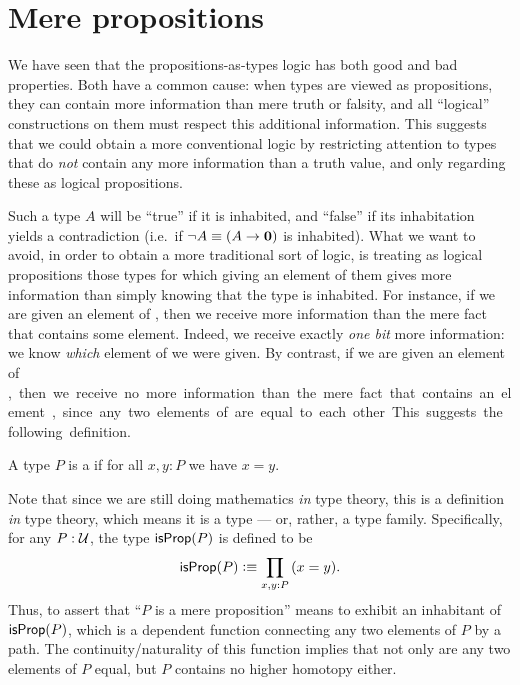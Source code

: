 \section{Mere propositions}
\label{subsec:hprops}

We have seen that the propositions-as-types logic has both good and bad properties.
Both have a common cause: when types are viewed as propositions, they can contain more information than mere truth or falsity, and all ``logical'' constructions on them must respect this additional information.
This suggests that we could obtain a more conventional logic by restricting attention to types that do \emph{not} contain any more information than a truth value, and only regarding these as logical propositions.

Such a type $A$ will be ``true'' if it is inhabited, and ``false'' if its inhabitation yields a contradiction (i.e.\ if $\neg A \equiv (A\to\mathbf{0})$ is inhabited).
What we want to avoid, in order to obtain a more traditional sort of logic, is treating as logical propositions those types for which giving an element of them gives more information than simply knowing that the type is inhabited.
For instance, if we are given an element of \bool, then we receive more information than the mere fact that \bool contains some element.
Indeed, we receive exactly \emph{one bit} more information: we know \emph{which} element of \bool we were given.
By contrast, if we are given an element of \unit, then we receive no more information than the mere fact that \unit contains an element, since any two elements of \unit are equal to each other.
This suggests the following definition.

\begin{defn}\label{defn:isprop}
  A type $P$ is a  if for all $x,y:P$ we have $x=y$.
\end{defn}

Note that since we are still doing mathematics \emph{in} type theory, this is a definition \emph{in} type theory, which means it is a type --- or, rather, a type family.
Specifically, for any $P:\mathcal{U}$, the type $\mathsf{isProp}(P)$ is defined to be
\[ \isprop(P) \defeq \prd{x,y:P} (x=y). \]
Thus, to assert that ``$P$ is a mere proposition'' means to exhibit an inhabitant of $\mathsf{isProp}(P)$, which is a dependent function connecting any two elements of $P$ by a path.
The continuity/naturality of this function implies that not only are any two elements of $P$ equal, but $P$ contains no higher homotopy either.

